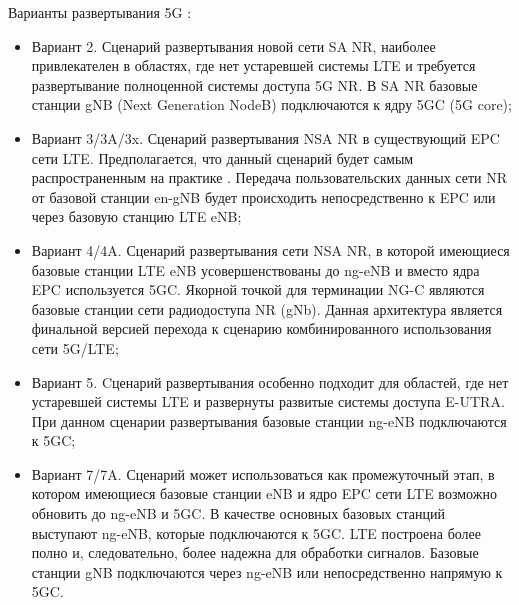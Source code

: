 Варианты развертывания 5G :
\begin{itemize}
  \item Вариант 2. Сценарий развертывания новой сети SA NR, наиболее привлекателен в областях, где нет устаревшей системы LTE и требуется развертывание полноценной системы доступа 5G NR. В SA NR базовые станции gNB (Next Generation NodeB) подключаются к ядру 5GC (5G core);
  \item Вариант 3/3A/3x. Сценарий развертывания NSA NR в существующий EPC сети LTE. Предполагается, что данный сценарий будет самым распространенным на практике \cite{EthemAlpaydn2019}. Передача пользовательских данных сети NR от базовой станции en-gNB будет происходить непосредственно к EPC или через базовую станцию LTE eNB;
  \item Вариант 4/4A. Сценарий развертывания сети NSA NR, в которой имеющиеся базовые станции LTE eNB усовершенствованы до ng-eNB и вместо ядра EPC используется 5GC. Якорной точкой для терминации NG-C являются базовые станции сети радиодоступа NR (gNb). Данная архитектура является финальной версией перехода к сценарию комбинированного использования сети 5G/LTE;
  \item Вариант 5. Cценарий развертывания особенно подходит для областей, где нет устаревшей системы LTE и развернуты развитые системы доступа E-UTRA. При данном сценарии развертывания базовые станции ng-eNB подключаются к 5GC;
  \item Вариант 7/7A. Сценарий может использоваться как промежуточный этап, в котором имеющиеся базовые станции eNB и ядро EPC сети LTE возможно обновить до ng-eNB и 5GC. В качестве основных базовых станций выступают ng-eNB, которые подключаются к 5GC.  LTE построена более полно и, следовательно, более надежна для обработки сигналов. Базовые станции gNB подключаются через ng-eNB или непосредственно напрямую к 5GC.
\end{itemize}





